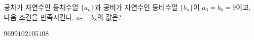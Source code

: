공차가 자연수인 등차수열 $\{a_n\}$과 공비가 자연수인 등비수열 $\{b_n\}$이 $a_6=b_6=9$이고, 다음 조건을 만족시킨다. \noindent $a_7+b_8$의 값은?
\begin{choices32}{$96$}{$99$}{$102$}{$105$}{$108$}\end{choices32}
